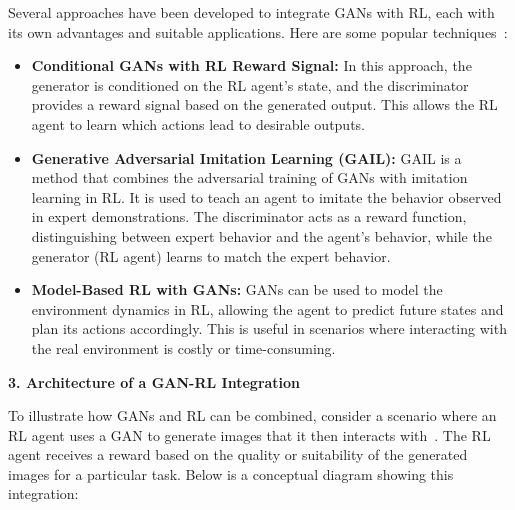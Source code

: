 Several approaches have been developed to integrate GANs with RL, each with its own advantages and suitable applications. Here are some popular techniques~\cite{wiering2012reinforcement}:
\begin{itemize}
    \item \textbf{Conditional GANs with RL Reward Signal:} In this approach, the generator is conditioned on the RL agent's state, and the discriminator provides a reward signal based on the generated output. This allows the RL agent to learn which actions lead to desirable outputs.
    \item \textbf{Generative Adversarial Imitation Learning (GAIL):} GAIL is a method that combines the adversarial training of GANs with imitation learning in RL. It is used to teach an agent to imitate the behavior observed in expert demonstrations. The discriminator acts as a reward function, distinguishing between expert behavior and the agent's behavior, while the generator (RL agent) learns to match the expert behavior.
    \item \textbf{Model-Based RL with GANs:} GANs can be used to model the environment dynamics in RL, allowing the agent to predict future states and plan its actions accordingly. This is useful in scenarios where interacting with the real environment is costly or time-consuming.
\end{itemize}

\textbf{3. Architecture of a GAN-RL Integration}

To illustrate how GANs and RL can be combined, consider a scenario where an RL agent uses a GAN to generate images that it then interacts with~\cite{sarmad2019rl}. The RL agent receives a reward based on the quality or suitability of the generated images for a particular task. Below is a conceptual diagram showing this integration:

\begin{center}
\end{center}

